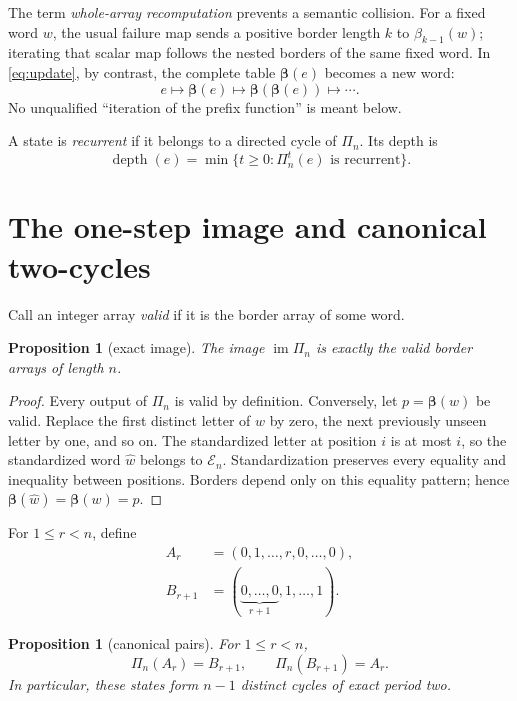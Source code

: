 \documentclass[10pt,a4paper]{amsart}
\newtheorem{proposition}[theorem]{Proposition}
\theoremstyle{definition}
\theoremstyle{remark}
\newcommand{\En}{\mathcal E_n}
\newcommand{\depth}{\operatorname{depth}}
\newcommand{\im}{\operatorname{im}}
\newcommand{\BA}{\boldsymbol\beta}
\begin{document}
The term \emph{whole-array recomputation} prevents a semantic collision.
For a fixed word $w$, the usual failure map sends a positive border length
$k$ to $\beta_{k-1}(w)$; iterating that scalar map follows the nested borders
of the same fixed word.  In \eqref{eq:update}, by contrast, the complete table
$\BA(e)$ becomes a new word:
\[
        e\longmapsto\BA(e)\longmapsto\BA(\BA(e))\longmapsto\cdots.
\]
No unqualified ``iteration of the prefix function'' is meant below.

A state is \emph{recurrent} if it belongs to a directed cycle of $\Pi_n$.
Its depth is
\[
 \depth(e)=\min\{t\ge0:\Pi_n^t(e)\text{ is recurrent}\}.
\]

\section{The one-step image and canonical two-cycles}

Call an integer array \emph{valid} if it is the border array of some word.

\begin{proposition}[exact image]\label{prop:image}
The image $\im\Pi_n$ is exactly the valid border arrays of length $n$.
\end{proposition}

\begin{proof}
Every output of $\Pi_n$ is valid by definition.  Conversely, let $p=\BA(w)$
be valid.  Replace the first distinct letter of $w$ by zero, the next
previously unseen letter by one, and so on.  The standardized letter at
position $i$ is at most $i$, so the standardized word $\widehat w$ belongs
to $\En$.  Standardization preserves every equality and inequality between
positions.  Borders depend only on this equality pattern; hence
$\BA(\widehat w)=\BA(w)=p$.
\end{proof}

For $1\le r<n$, define
\begin{align}
 A_r&=(0,1,\ldots,r,0,\ldots,0),\label{eq:A}\\
 B_{r+1}&=(\underbrace{0,\ldots,0}_{r+1},1,\ldots,1).\label{eq:B}
\end{align}

\begin{proposition}[canonical pairs]\label{prop:pairs}
For $1\le r<n$,
\begin{equation}
                  \Pi_n(A_r)=B_{r+1},\qquad
                  \Pi_n(B_{r+1})=A_r.                 \label{eq:pairs}
\end{equation}
In particular, these states form $n-1$ distinct cycles of exact period two.
\end{proposition}
\end{document}
